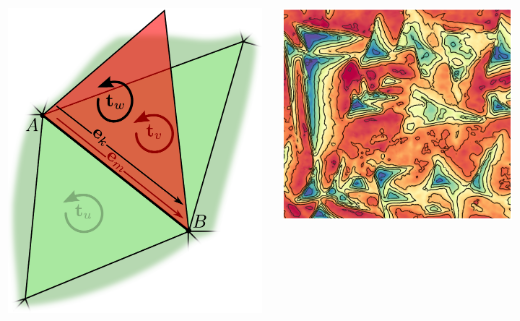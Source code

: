 \documentclass[aspectratio=169,t]{beamer}
\begin{document}
{\begin{columns}[T]
\begin{column}{.5\textwidth}
{\begin{columns}[T]
\begin{column}{.35\textwidth}
						\includegraphics[width=\linewidth]{figures/badMesh3.png}
					\end{column}
					\begin{column}{.5\textwidth}
						\includegraphics[width=\linewidth]{figures/beforeFilter.png}\\

\end{column}
\end{columns}}
\end{column}
\end{columns}}
\end{document}
